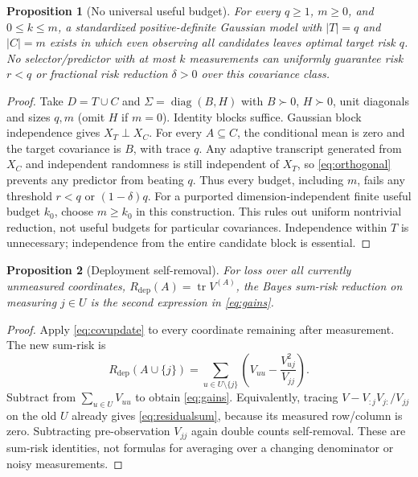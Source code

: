 \documentclass{article}
\newtheorem{proposition}{Proposition}
\newcommand{\tr}{\operatorname{tr}}
\begin{document}
\begin{proposition}[No universal useful budget]\label{prop:independent}
For every $q\geq1$, $m\geq0$, and $0\leq k\leq m$, a standardized positive-definite Gaussian model with $|T|=q$ and $|C|=m$ exists in which even observing all candidates leaves optimal target risk $q$. No selector/predictor with at most $k$ measurements can uniformly guarantee risk $r<q$ or fractional risk reduction $\delta>0$ over this covariance class.
\end{proposition}
\begin{proof}
Take $D=T\cup C$ and $\Sigma=\operatorname{diag}(B,H)$ with $B\succ0$, $H\succ0$, unit diagonals and sizes $q,m$ (omit $H$ if $m=0$). Identity blocks suffice. Gaussian block independence gives $X_T\perp X_C$. For every $A\subseteq C$, the conditional mean is zero and the target covariance is $B$, with trace $q$. Any adaptive transcript generated from $X_C$ and independent randomness is still independent of $X_T$, so \eqref{eq:orthogonal} prevents any predictor from beating $q$. Thus every budget, including $m$, fails any threshold $r<q$ or $(1-\delta)q$. For a purported dimension-independent finite useful budget $k_0$, choose $m\geq k_0$ in this construction. This rules out uniform nontrivial reduction, not useful budgets for particular covariances. Independence within $T$ is unnecessary; independence from the entire candidate block is essential.
\end{proof}

\begin{proposition}[Deployment self-removal]\label{prop:deployment}
For loss over all currently unmeasured coordinates, $R_{\mathrm{dep}}(A)=\tr V^{(A)}$, the Bayes sum-risk reduction on measuring $j\in U$ is the second expression in \eqref{eq:gains}.
\end{proposition}
\begin{proof}
Apply \eqref{eq:covupdate} to every coordinate remaining after measurement. The new sum-risk is
\begin{equation}
 R_{\mathrm{dep}}(A\cup\{j\})=\sum_{u\in U\setminus\{j\}}\left(V_{uu}-\frac{V_{uj}^2}{V_{jj}}\right).
 \label{eq:residualsum}
\end{equation}
Subtract from $\sum_{u\in U}V_{uu}$ to obtain \eqref{eq:gains}. Equivalently, tracing $V-V_{:j}V_{j:}/V_{jj}$ on the old $U$ already gives \eqref{eq:residualsum}, because its measured row/column is zero. Subtracting pre-observation $V_{jj}$ again double counts self-removal. These are sum-risk identities, not formulas for averaging over a changing denominator or noisy measurements.
\end{proof}
\end{document}
